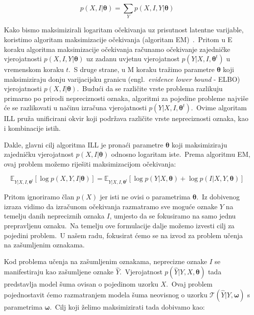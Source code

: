 \documentclass[diplomskirad]{fer}
\begin{document}
\begin{equation}
  p(X, I | \bm{\theta}) = \sum_{Y} p(X, I, Y | \bm{\theta})
  \label{eq:ill_joint}
\end{equation}

Kako bismo maksimizirali logaritam očekivanja uz prisutnost latentne varijable, koristimo algoritam maksimizacije očekivanja (algoritam EM)~\cite{moon1996expectation}.\
Pritom u E koraku algoritma maksimizacije očekivanja računamo očekivanje zajedničke vjerojatnosti $p(X, I, Y | \bm{\theta})$ uz zadanu uvjetnu vjerojatnost $p(Y | X, I, \bm{\theta}^t)$ u vremenskom koraku $t$.\ 
S druge strane, u M koraku tražimo parametre $\bm{\theta}$ koji maksimiziraju donju varijacijsku granicu (engl.\ \textit{evidence lower bound} - ELBO) vjerojatnosti $p(X, I | \bm{\theta})$.\ 
Budući da se različite vrste problema razlikuju primarno po prirodi nepreciznosti oznaka, algoritmi za pojedine probleme najviše će se razlikovati u načinu izračuna vjerojatnosti $p(Y | X, I, \bm{\theta}^t)$.\
Ovime algoritam ILL pruža unificirani okvir koji podržava različite vrste nepreciznosti oznaka, kao i kombinacije istih.\

Dakle, glavni cilj algoritma ILL je pronaći parametre $\bm{\theta}$ koji maksimiziraju zajedničku vjerojatnost $p(X, I | \bm{\theta})$ odnosno logaritam iste.\
Prema algoritmu EM, ovaj problem možemo riješiti maksimizacijom očekivanja:

\begin{equation}
  \mathbb{E}_{Y | X, I, \bm{\theta}^t} \left[ \log p(X, Y, I | \bm{\theta}) \right] = \mathbb{E}_{Y | X, I, \bm{\theta}^t} \left[ \log p(Y | X, \bm{\theta}) + \log p(I | X, Y, \bm{\theta}) \right]
  \label{eq:ill_expectation}
\end{equation}

\pagebreak

Pritom ignoriramo član $p(X)$ jer isti ne ovisi o parametrima $\bm{\theta}$.\ Iz dobivenog izraza vidimo da izračunom očekivanja razmatramo sve moguće oznake $Y$ na temelju danih nepreciznih oznaka $I$, umjesto da se fokusiramo na samo jednu prepravljenu oznaku.\
Na temelju ove formulacije dalje možemo izvesti cilj za pojedini problem.\ U našem radu, fokusirat ćemo se na izvod za problem učenja na zašumljenim oznakama.\ 

Kod problema učenja na zašumljenim oznakama, neprecizne oznake $I$ se manifestiraju kao zašumljene oznake $\hat{Y}$.\ 
Vjerojatnost $p(\hat{Y} | Y, X, \bm{\theta})$ tada predstavlja model šuma ovisan o pojedinom uzorku $X$.\ 
Ovaj problem pojednostavit ćemo razmatranjem modela šuma neovisnog o uzorku $\mathcal{T}(\hat{Y} | Y, \bm{\omega})$ s parametrima $\bm{\omega}$.\ Cilj koji želimo maksimizirati tada dobivamo kao:
\end{document}
